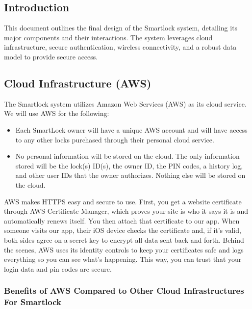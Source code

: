 

\subsection{Introduction}
This document outlines the final design of the Smartlock system, detailing its major components and their interactions. The system leverages cloud infrastructure, secure authentication, wireless connectivity, and a robust data model to provide secure access.

\subsection{Cloud Infrastructure (AWS)}
The Smartlock system utilizes Amazon Web Services (AWS) as its cloud service. We will use AWS for the following:
\begin{itemize}
    \item Each SmartLock owner will have a unique AWS account and will have access to any other locks purchased through their personal cloud service. 
    \item No personal information will be stored on the cloud. The only information stored will be the lock(s) ID(s), the owner ID, the PIN codes, a history log, and other user IDs that the owner authorizes. Nothing else will be stored on the cloud.
\end{itemize}
AWS makes HTTPS easy and secure to use. First, you get a website certificate through AWS Certificate Manager, which proves your site is who it says it is and automatically renews itself. You then attach that certificate to our app. When someone visits our app, their iOS device checks the certificate and, if it’s valid, both sides agree on a secret key to encrypt all data sent back and forth. Behind the scenes, AWS uses its identity controls to keep your certificates safe and logs everything so you can see what’s happening. This way, you can trust that your login data and pin codes are secure.

\subsubsection*{Benefits of AWS Compared to Other Cloud Infrastructures For Smartlock}

